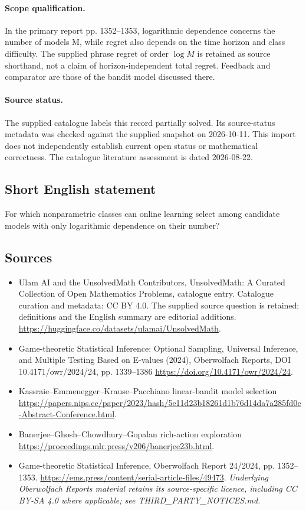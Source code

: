 \documentclass[11pt]{article}
\begin{document}
\paragraph{Scope qualification.}
In the primary report pp. 1352--1353, logarithmic dependence concerns the number of models M, while regret also depends on the time horizon and class difficulty. The supplied phrase regret of order $\log M$ is retained as source shorthand, not a claim of horizon-independent total regret. Feedback and comparator are those of the bandit model discussed there.
\paragraph{Source status.}
The supplied catalogue labels this record partially solved. Its source-status metadata was checked against the supplied snapshot on 2026-10-11. This import does not independently establish current open status or mathematical correctness. The catalogue literature assessment is dated 2026-08-22.
\subsection{Short English statement}
For which nonparametric classes can online learning select among candidate models with only logarithmic dependence on their number?
\subsection{Sources}
\begin{itemize}
\item[S1] Ulam AI and the UnsolvedMath Contributors, UnsolvedMath: A Curated Collection of Open Mathematics Problems, catalogue entry. Catalogue curation and metadata: CC BY 4.0. The supplied source question is retained; definitions and the English summary are editorial additions.
\url{https://huggingface.co/datasets/ulamai/UnsolvedMath}.
\item[S2] Game-theoretic Statistical Inference: Optional Sampling, Universal Inference, and Multiple Testing Based on E-values (2024), Oberwolfach Reports, DOI 10.4171/owr/2024/24, pp. 1339--1386
\url{https://doi.org/10.4171/owr/2024/24}.
\item[S3] Kassraie--Emmenegger--Krause--Pacchiano linear-bandit model selection
\url{https://papers.nips.cc/paper/2023/hash/5e11d23b18261d1b76d14da7a285fd0c-Abstract-Conference.html}.
\item[S4] Banerjee--Ghosh--Chowdhury--Gopalan rich-action exploration
\url{https://proceedings.mlr.press/v206/banerjee23b.html}.
\item[S5] Game-theoretic Statistical Inference, Oberwolfach Report 24/2024, pp. 1352--1353.
\url{https://ems.press/content/serial-article-files/49473}.
\textit{Underlying Oberwolfach Reports material retains its source-specific licence, including CC BY-SA 4.0 where applicable; see THIRD\_PARTY\_NOTICES.md.}
\end{itemize}
\end{document}
